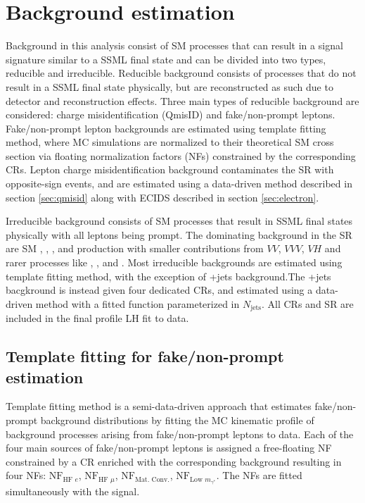 \documentclass[../thesis.tex]{subfiles}
\begin{document}
\section{Background estimation}
\label{sec:bg}
Background in this analysis consist of \acs{SM} processes that can result in a signal signature similar to a \tttt \acs{SSML} final state and can be divided into two types, reducible and irreducible. Reducible background consists of processes that do not result in a \acs{SSML} final state physically, but are reconstructed as such due to detector and reconstruction effects. Three main types of reducible background are considered: charge misidentification (\acs{QmisID}) and fake/non-prompt leptons. Fake/non-prompt lepton backgrounds are estimated using template fitting method, where \acs{MC} simulations are normalized to their theoretical \acs{SM} cross section via floating normalization factors (\acs{NF}s) constrained by the corresponding \acs{CR}s. Lepton charge misidentification background contaminates the \acs{SR} with opposite-sign events, and are estimated using a data-driven method described in section \ref{sec:qmisid} along with \acs{ECIDS} described in section \ref{sec:electron}.

Irreducible background consists of \acs{SM} processes that result in \acs{SSML} final states physically with all leptons being prompt. The dominating background in the \acs{SR} are \acs{SM} \tttt, \ttW, \ttZ, and \ttH production with smaller contributions from $VV$, $VVV$, $VH$ and rarer processes like \ttVV, \tWZ, \tZq and \ttt. Most irreducible backgrounds are estimated using template fitting method, with the exception of \ttW+jets background.The \ttW+jets bacgkround is instead given four dedicated \acs{CR}s, and estimated using a data-driven method with a fitted function parameterized in $N_\mathrm{jets}$. All \acs{CR}s and \acs{SR} are included in the final profile \acs{LH} fit to data.

\subsection{Template fitting for fake/non-prompt estimation}
\label{sec:template}
Template fitting method is a semi-data-driven approach \citep{bg:ttH_ttW_ML} that estimates fake/non-prompt background distributions by fitting the \acs{MC} kinematic profile of background processes arising from fake/non-prompt leptons to data. Each of the four main sources of fake/non-prompt leptons is assigned a free-floating \acs{NF} constrained by a \acs{CR} enriched with the corresponding background resulting in four \acs{NF}s: $\mathrm{NF}_{\text{HF }e}$, $\mathrm{NF}_{\text{HF }\mu}$, $\mathrm{NF}_{\text{Mat. Conv.}}$, $\mathrm{NF}_{\text{Low }m_{\gamma^{*}}}$. The \acs{NF}s are fitted simultaneously with the signal.
\end{document}
